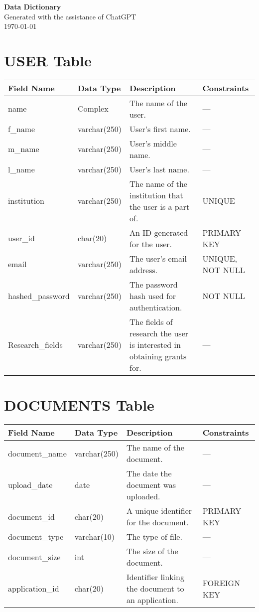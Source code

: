 \documentclass[12pt]{article}
\begin{document}
\begin{titlepage}
    \centering
    {\Huge \textbf{Data Dictionary}}\\[1.5em]
    {\Large Generated with the assistance of ChatGPT}\\[1em]
    {\large \today}
\end{titlepage}

\tableofcontents
\newpage

\section{USER Table}

\begin{longtable}{@{}p{4cm}p{3cm}p{6cm}p{3cm}@{}}
\toprule
\textbf{Field Name} & \textbf{Data Type} & \textbf{Description} & \textbf{Constraints} \\ \midrule
\endhead
name & Complex & The name of the user. & --- \\
f\_name & varchar(250) & User’s first name. & --- \\
m\_name & varchar(250) & User’s middle name. & --- \\
l\_name & varchar(250) & User’s last name. & --- \\
institution & varchar(250) & The name of the institution that the user is a part of. & UNIQUE \\
user\_id & char(20) & An ID generated for the user. & PRIMARY KEY \\
email & varchar(250) & The user’s email address. & UNIQUE, NOT NULL \\
hashed\_password & varchar(250) & The password hash used for authentication. & NOT NULL \\
Research\_fields & varchar(250) & The fields of research the user is interested in obtaining grants for. & --- \\ 
\bottomrule
\end{longtable}

\section{DOCUMENTS Table}

\begin{longtable}{@{}p{4cm}p{3cm}p{6cm}p{3cm}@{}}
\toprule
\textbf{Field Name} & \textbf{Data Type} & \textbf{Description} & \textbf{Constraints} \\ \midrule
\endhead
document\_name & varchar(250) & The name of the document. & --- \\
upload\_date & date & The date the document was uploaded. & --- \\
document\_id & char(20) & A unique identifier for the document. & PRIMARY KEY \\
document\_type & varchar(10) & The type of file. & --- \\
document\_size & int & The size of the document. & --- \\
application\_id & char(20) & Identifier linking the document to an application. & FOREIGN KEY \\ 
\bottomrule
\end{longtable}
\end{document}
